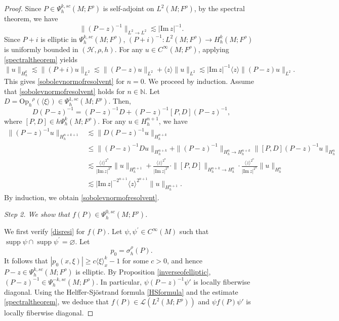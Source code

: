 \documentclass[11pt,oneside,reqno]{amsart}
\newcommand\N{\ensuremath{\mathbb{N}}}
\newcommand\Oph{\ensuremath{\mathrm{Op}_h}}
\theoremstyle{definition}
\numberwithin{equation}{section}
\theoremstyle{plain}
\begin{document}
\begin{proof}
Since $P \in \Psi^{k,sc}_{h}(M;F^\rho)$ is self-adjoint on $L^2(M;F^{\rho})$, by the spectral theorem, we have 
\begin{equation}\label{spectraltheorem}
\|(P-z)^{-1}\|_{L^2\to L^2} \lesssim |\mathrm{Im} \, z|^{-1}.
\end{equation}
Since $P+i$ is elliptic in $\Psi^{k,sc}_h(M;F^\rho)$, $(P+i)^{-1}: L^2(M;F^{\rho})\to H^{k}_h(M;F^{\rho})$ is uniformly bounded in $(\mathcal{H},\rho,h)$. For any $u\in C^{\infty}(M;F^{\rho})$, applying \eqref{spectraltheorem} yields
\begin{equation*}
\|u\|_{H^{k}_h}\lesssim \|(P+i)u\|_{L^2}\lesssim \|(P-z)u\|_{L^2}+\langle z\rangle\|u\|_{L^2}\lesssim |\mathrm{Im} \, z|^{-1} \langle z\rangle \|(P-z)u\|_{L^2}.
\end{equation*}
This gives \eqref{sobolevnormofresolvent} for $n=0$. We proceed by induction. Assume that \eqref{sobolevnormofresolvent} holds for $n\in \N$. Let $D=\Oph^{\rho}(\langle \xi \rangle) \in \Psi^{1,sc}_h(M;F^\rho)$. Then,
\begin{equation*}
    D(P-z)^{-1}=(P-z)^{-1}D+(P-z)^{-1}[P,D](P-z)^{-1},
\end{equation*}
where $[P,D]\in h\Psi^k_h(M;F^\rho)$. For any $u \in H^{n+1}_{h}$, we have
\begin{equation*}
\begin{aligned}
\|(P-z)^{-1}u\|_{H^{n+k+1}_h} &\lesssim \|D(P-z)^{-1}u\|_{H^{n+k}_h}\\
& \leq\|(P-z)^{-1}Du\|_{H^{n+k}_h}+\|(P-z)^{-1}\|_{H^{n}_h\to H^{n+k}_{h}}  \|[P,D](P-z)^{-1}u\|_{H^{n}_h}\\
&\lesssim  \frac{\langle z\rangle^{2^n}}{|\mathrm{Im} \, z|^{2^n}}\|u\|_{H^{n+1}_h}+\frac{\langle z\rangle^{2^n}}{|\mathrm{Im} \, z|^{2^n}} \cdot \|[P,D]\|_{H^{n+k}_h\to H^n_h} \cdot\frac{\langle z\rangle^{2^n}}{|\mathrm{Im} \, z|^{2^n}}\|u\|_{H^n_h}\\
&\lesssim |\mathrm{Im} \, z|^{-2^{n+1}} \langle z\rangle^{2^{n+1}} \|u\|_{H^{n+1}_h}.
\end{aligned}
\end{equation*}
By induction, we obtain \eqref{sobolevnormofresolvent}.

\emph{Step 2. We show that $f(P)\in \Psi^{0,sc}_h(M;F^\rho)$.} 

We first verify \eqref{disresi} for $f(P)$. Let $\psi, \psi^{\prime} \in C^{\infty}(M)$ such that $\operatorname{supp} \psi \cap \operatorname{supp} \psi^{\prime}=\varnothing$. Let 
\begin{equation*}
    p_{0}=\sigma^{\rho}_{h}(P).
\end{equation*}
It follows that $|p_{0}(x,\xi)|\geq c\langle \xi \rangle_{x}^k-1$ for some $c>0$, and hence $P -z \in \Psi^{k,sc}_{h}(M;F^\rho)$ is elliptic. By Proposition \ref{inverseofelliptic}, $(P-z)^{-1} \in \Psi^{-k,sc}_{h}(M;F^\rho)$. In particular, $\psi (P-z)^{-1} \psi'$ is locally fiberwise diagonal. Using the Helffer-Sj\"{o}strand formula \eqref{HSformula} and the estimate \eqref{spectraltheorem}, we deduce that $f(P)\in \mathcal{L}(L^2(M;F^{\rho}))$ and $\psi f(P)\psi'$ is locally fiberwise diagonal. 


\end{proof}
\end{document}
